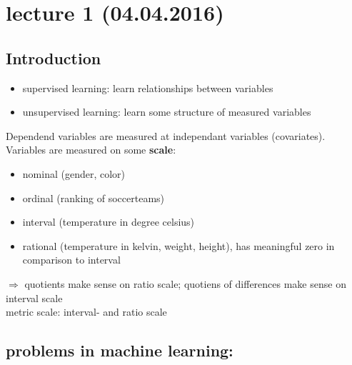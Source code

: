 \section*{lecture 1 (04.04.2016)}
\subsection*{Introduction}

	\begin{itemize}
	 \item supervised learning: learn relationships between variables
	 \item unsupervised learning: learn some structure of measured variables
	\end{itemize}
	
	Dependend variables are measured at independant variables (covariates). Variables are measured on some \textbf{scale}:
	
	\begin{itemize}
	 \item nominal (gender, color)
	 \item ordinal (ranking of soccerteams)
	 \item interval (temperature in degree celsius)
	 \item rational (temperature in kelvin, weight, height), has meaningful zero in comparison to interval
	\end{itemize}
	
	$\Rightarrow$ quotients make sense on ratio scale; quotiens of differences make sense on interval scale\\
	
	metric scale: interval- and ratio scale  \\

\subsection*{problems in machine learning:}

